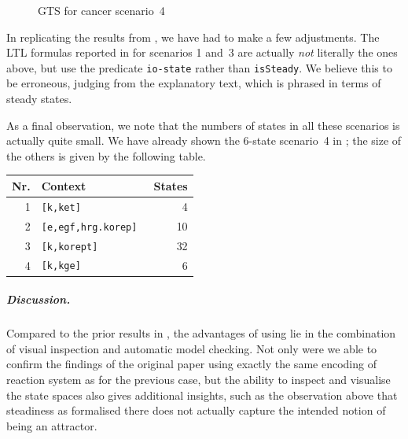 %
\begin{figure}\centering
\scalebox{.9}{}
\caption{GTS for cancer scenario~4}
\label{fig:maude-gts}
\end{figure}
%
In replicating the results from \cite{DBLP:conf/cmsb/BallisBFO24}, we have had to make a few adjustments. The LTL formulas reported in \cite[Page~14]{DBLP:conf/cmsb/BallisBFO24} for scenarios 1 and~3 are actually \emph{not} literally the ones above, but use the predicate \verb=io-state= rather than \verb=isSteady=. We believe this to be erroneous, judging from the explanatory text, which is phrased in terms of steady states.

As a final observation, we note that the numbers of states in all these scenarios is actually quite small. We have already shown the 6-state scenario~4 in ; the size of the others is given by the following table.
%
\begin{center}
\begin{tabular}{rlr}
\bf Nr. & \bf Context & \bf States \\
\hline\hline
1 & \tt [k,ket] & 4 \\
2 & \tt [{e,egf,hrg}.korep] & 10 \\
3 & \tt [k,korept] & 32 \\
4 & \tt [k,kge] & 6
\end{tabular}
\end{center}

\subparagraph*{Discussion.}

Compared to the prior results in \cite{DBLP:conf/cmsb/BallisBFO24}, the advantages of using \GROOVE lie in the combination of visual inspection and automatic model checking. Not only were we able to confirm the findings of the original paper using exactly the same encoding of reaction system as for the previous case, but the ability to inspect and visualise the state spaces also gives additional insights, such as the observation above that steadiness as formalised there does not actually capture the intended notion of being an attractor.
